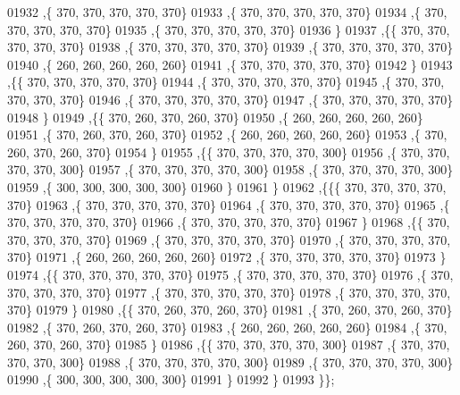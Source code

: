 \begin{DoxyCode}
01932    ,\{   370,   370,   370,   370,   370\}
01933    ,\{   370,   370,   370,   370,   370\}
01934    ,\{   370,   370,   370,   370,   370\}
01935    ,\{   370,   370,   370,   370,   370\}
01936    \}
01937   ,\{\{   370,   370,   370,   370,   370\}
01938    ,\{   370,   370,   370,   370,   370\}
01939    ,\{   370,   370,   370,   370,   370\}
01940    ,\{   260,   260,   260,   260,   260\}
01941    ,\{   370,   370,   370,   370,   370\}
01942    \}
01943   ,\{\{   370,   370,   370,   370,   370\}
01944    ,\{   370,   370,   370,   370,   370\}
01945    ,\{   370,   370,   370,   370,   370\}
01946    ,\{   370,   370,   370,   370,   370\}
01947    ,\{   370,   370,   370,   370,   370\}
01948    \}
01949   ,\{\{   370,   260,   370,   260,   370\}
01950    ,\{   260,   260,   260,   260,   260\}
01951    ,\{   370,   260,   370,   260,   370\}
01952    ,\{   260,   260,   260,   260,   260\}
01953    ,\{   370,   260,   370,   260,   370\}
01954    \}
01955   ,\{\{   370,   370,   370,   370,   300\}
01956    ,\{   370,   370,   370,   370,   300\}
01957    ,\{   370,   370,   370,   370,   300\}
01958    ,\{   370,   370,   370,   370,   300\}
01959    ,\{   300,   300,   300,   300,   300\}
01960    \}
01961   \}
01962  ,\{\{\{   370,   370,   370,   370,   370\}
01963    ,\{   370,   370,   370,   370,   370\}
01964    ,\{   370,   370,   370,   370,   370\}
01965    ,\{   370,   370,   370,   370,   370\}
01966    ,\{   370,   370,   370,   370,   370\}
01967    \}
01968   ,\{\{   370,   370,   370,   370,   370\}
01969    ,\{   370,   370,   370,   370,   370\}
01970    ,\{   370,   370,   370,   370,   370\}
01971    ,\{   260,   260,   260,   260,   260\}
01972    ,\{   370,   370,   370,   370,   370\}
01973    \}
01974   ,\{\{   370,   370,   370,   370,   370\}
01975    ,\{   370,   370,   370,   370,   370\}
01976    ,\{   370,   370,   370,   370,   370\}
01977    ,\{   370,   370,   370,   370,   370\}
01978    ,\{   370,   370,   370,   370,   370\}
01979    \}
01980   ,\{\{   370,   260,   370,   260,   370\}
01981    ,\{   370,   260,   370,   260,   370\}
01982    ,\{   370,   260,   370,   260,   370\}
01983    ,\{   260,   260,   260,   260,   260\}
01984    ,\{   370,   260,   370,   260,   370\}
01985    \}
01986   ,\{\{   370,   370,   370,   370,   300\}
01987    ,\{   370,   370,   370,   370,   300\}
01988    ,\{   370,   370,   370,   370,   300\}
01989    ,\{   370,   370,   370,   370,   300\}
01990    ,\{   300,   300,   300,   300,   300\}
01991    \}
01992   \}
01993  \}\};
\end{DoxyCode}
